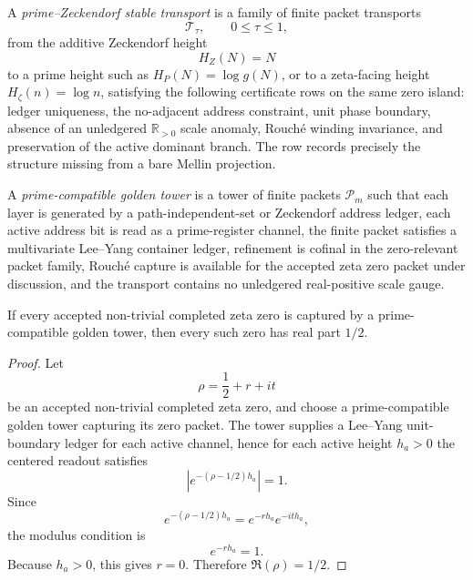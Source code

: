 \begin{definition}
\label{def:rh-prime-zeckendorf-stable-transport}
A \emph{prime--Zeckendorf stable transport} is a family of finite packet
transports
$$
\mathcal T_\tau,
\qquad
0\le\tau\le1,
$$
from the additive Zeckendorf height
$$
H_Z(N)=N
$$
to a prime height such as $H_P(N)=\log g(N)$, or to a zeta-facing height
$H_\zeta(n)=\log n$, satisfying the following certificate rows on the
same zero island:
ledger uniqueness, the no-adjacent address constraint, unit phase
boundary, absence of an unledgered $\mathbb R_{>0}$ scale anomaly,
Rouch\'e winding invariance, and preservation of the active dominant
branch.  The row records precisely the structure missing from a bare
Mellin projection.
\end{definition}

\begin{definition}
\label{def:rh-prime-compatible-golden-tower}
A \emph{prime-compatible golden tower} is a tower of finite packets
$\mathcal P_m$ such that each layer is generated by a
path-independent-set or Zeckendorf address ledger, each active address
bit is read as a prime-register channel, the finite packet satisfies a
multivariate Lee--Yang container ledger, refinement is cofinal in the
zero-relevant packet family, Rouch\'e capture is available for the
accepted zeta zero packet under discussion, and the transport contains
no unledgered real-positive scale gauge.
\end{definition}

\begin{theorem}
\label{thm:rh-prime-compatible-golden-tower-fixed-half-readout}
If every accepted non-trivial completed zeta zero is captured by a
prime-compatible golden tower, then every such zero has real part
$1/2$.
\end{theorem}

\begin{proof}
Let
$$
\rho=\frac12+r+it
$$
be an accepted non-trivial completed zeta zero, and choose a
prime-compatible golden tower capturing its zero packet.  The tower
supplies a Lee--Yang unit-boundary ledger for each active channel, hence
for each active height $h_a>0$ the centered readout satisfies
$$
\left|e^{-(\rho-1/2)h_a}\right|=1.
$$
Since
$$
e^{-(\rho-1/2)h_a}=e^{-rh_a}e^{-ith_a},
$$
the modulus condition is
$$
e^{-rh_a}=1.
$$
Because $h_a>0$, this gives $r=0$.  Therefore
$\Re(\rho)=1/2$.
\end{proof}

